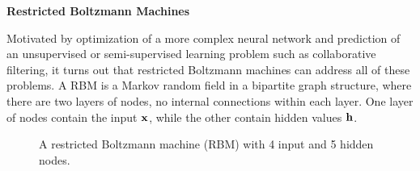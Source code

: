 
\noindent
\large
{\bf Restricted Boltzmann Machines}
\normalsize

Motivated by optimization of a more complex neural network
and prediction of an unsupervised or semi-supervised learning problem
such as collaborative filtering,
it turns out that restricted Boltzmann machines can address 
all of these problems. 
A RBM is a Markov random field in a bipartite graph structure,
where there are two layers of nodes,
no internal connections within each layer.
One layer of nodes contain the input $\mathbf{x}$,
while the other contain hidden values $\mathbf{h}$.
%
\def\layersep{2.5cm}
\begin{figure}[h]
\centering{}

\caption{\label{fig:RBM}
A restricted Boltzmann machine (RBM) with 4 input and 5 hidden nodes.
}
\end{figure}

